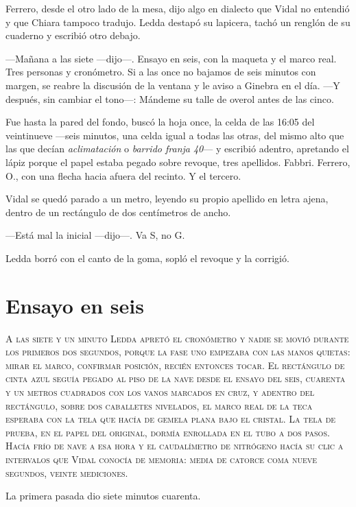 Ferrero, desde el otro lado de la mesa, dijo algo en dialecto que Vidal no entendió y que Chiara tampoco tradujo. Ledda destapó su lapicera, tachó un renglón de su cuaderno y escribió otro debajo.

---Mañana a las siete ---dijo---. Ensayo en seis, con la maqueta y el marco real. Tres personas y cronómetro. Si a las once no bajamos de seis minutos con margen, se reabre la discusión de la ventana y le aviso a Ginebra en el día. ---Y después, sin cambiar el tono---: Mándeme su talle de overol antes de las cinco.

Fue hasta la pared del fondo, buscó la hoja once, la celda de las 16:05 del veintinueve ---seis minutos, una celda igual a todas las otras, del mismo alto que las que decían \textit{aclimatación} o \textit{barrido franja 40}--- y escribió adentro, apretando el lápiz porque el papel estaba pegado sobre revoque, tres apellidos. Fabbri. Ferrero, O., con una flecha hacia afuera del recinto. Y el tercero.

Vidal se quedó parado a un metro, leyendo su propio apellido en letra ajena, dentro de un rectángulo de dos centímetros de ancho.

---Está mal la inicial ---dijo---. Va S, no G.

Ledda borró con el canto de la goma, sopló el revoque y la corrigió.

\clearpage

\chapter{Ensayo en seis}

\lettrine[lines=2, lhang=0.1, nindent=0.2em]{A}{ las siete y un minuto Ledda apretó el cronómetro y nadie se movió durante los primeros dos segundos, porque la fase uno empezaba con las manos quietas: mirar el marco, confirmar posición, recién entonces tocar. El rectángulo de cinta azul seguía pegado al piso de la nave desde el ensayo del seis, cuarenta y un metros cuadrados con los vanos marcados en cruz, y adentro del rectángulo, sobre dos caballetes nivelados, el marco real de la teca esperaba con la tela que hacía de gemela plana bajo el cristal. La tela de prueba, en el papel del original, dormía enrollada en el tubo a dos pasos. Hacía frío de nave a esa hora y el caudalímetro de nitrógeno hacía su clic a intervalos que Vidal conocía de memoria: media de catorce coma nueve segundos, veinte mediciones.}


La primera pasada dio siete minutos cuarenta.

